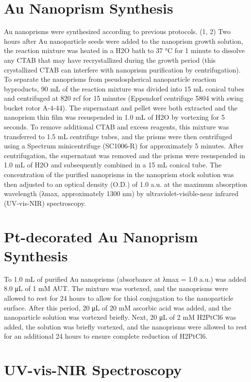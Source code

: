 \documentclass [11pt, proquest] {uwthesis}[2016/11/22]
\begin{document}
\section{Au Nanoprism Synthesis}

Au nanoprisms were synthesized according to previous protocols. (1, 2) Two hours after Au nanoparticle seeds were added to the nanoprism growth solution, the reaction mixture was heated in a H2O bath to 37 °C for 1 minute to dissolve any CTAB that may have recrystallized during the growth period (this crystallized CTAB can interfere with nanoprism purification by centrifugation). To separate the nanoprisms from pseudospherical nanoparticle reaction byproducts, 90 mL of the reaction mixture was divided into 15 mL conical tubes and
centrifuged at 820 rcf for 15 minutes (Eppendorf centrifuge 5804 with swing bucket rotor A-4-44). The supernatant and pellet were both extracted and the nanoprism thin film was resuspended in 1.0 mL of H2O by vortexing for 5 seconds. To remove additional CTAB and excess reagents, this mixture was transferred to 1.5 mL centrifuge tubes, and the prisms were then centrifuged using a Spectrum minicentrifuge (SC1006-R) for approximately 5 minutes. After centrifugation, the supernatant was removed and the prisms were resuspended in 1.0 mL of H2O and subsequently combined in a 15 mL conical tube. The concentration of the purified nanoprisms in the nanoprism stock solution was then adjusted to an optical density (O.D.) of 1.0 a.u. at the maximum absorption wavelength (λmax, approximately 1300 nm) by ultraviolet-visible-near infrared (UV-vis-NIR) spectroscopy.

\section{Pt-decorated Au Nanoprism Synthesis}

To 1.0 mL of purified Au nanoprisms (absorbance at λmax = 1.0 a.u.) was added 8.0 μL of 1 mM AUT. The mixture was
vortexed, and the nanoprisms were allowed to rest for 24 hours to allow for thiol conjugation to the nanoparticle surface. After this period, 20 μL of 20 mM ascorbic acid was added, and the nanoparticle solution was vortexed briefly. Next, 20 μL of 2 mM H2PtCl6 was added, the solution was briefly vortexed, and the nanoprisms were allowed to rest for an additional 24 hours to ensure complete reduction of H2PtCl6. 

\section{UV-vis-NIR Spectroscopy}
\end{document}
